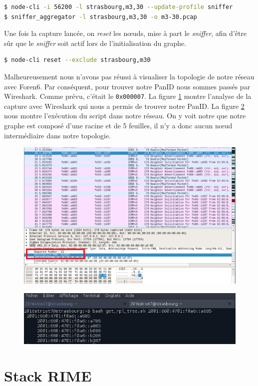 \documentclass[	DIV=calc,%
							paper=a4,%
							fontsize=11pt,%
			  ]{scrartcl}	 					%
\begin{document}
\begin{lstlisting}[language=bash]
$ node-cli -i 56200 -l strasbourg,m3,30 --update-profile sniffer
$ sniffer_aggregator -l strasbourg,m3,30 -o m3-30.pcap
\end{lstlisting}

Une fois la capture lancée, on \textit{reset} les nœuds, mise à part le \textit{sniffer}, afin d'être sûr que le \textit{sniffer} soit actif lors de l'initialisation du graphe.

\begin{lstlisting}[language=bash]
$ node-cli reset --exclude strasbourg,m30 
\end{lstlisting}

Malheureusement nous n'avons pas réussi à visualiser la topologie de notre réseau avec Foren6. Par conséquent, pour trouver notre PanID nous sommes passés par Wireshark. Comme prévu, c'était le \texttt{0x000007}.
La figure \ref{fig:wireshark} montre l'analyse de la capture avec Wireshark qui nous a permis de trouver notre PanID. La figure \ref{fig:script} nous montre l'exécution du script dans notre réseau. On y voit notre que notre graphe est composé d'une racine et de 5 feuilles, il n'y a donc aucun nœud intermédiaire dans notre topologie.

\begin{figure}
\centering
  \includegraphics[keepaspectratio,width=\linewidth]{img/pan_id_720}
  \label{fig:wireshark}
\end{figure}

\begin{figure}
\centering
  \includegraphics[keepaspectratio,width=\linewidth]{img/tree}
  \label{fig:script}
\end{figure}

\section{Stack RIME}
\end{document}
